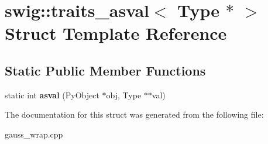 \hypertarget{structswig_1_1traits__asval_3_01_type_01_5_01_4}{\section{swig\-:\-:traits\-\_\-asval$<$ Type $\ast$ $>$ Struct Template Reference}
\label{structswig_1_1traits__asval_3_01_type_01_5_01_4}
}
\subsection*{Static Public Member Functions}
\begin{DoxyCompactItemize}
\item 
\hypertarget{structswig_1_1traits__asval_3_01_type_01_5_01_4_a32b6c9822265d2822408db76cbae92c4}{static int {\bfseries asval} (Py\-Object $\ast$obj, Type $\ast$$\ast$val)}\label{structswig_1_1traits__asval_3_01_type_01_5_01_4_a32b6c9822265d2822408db76cbae92c4}

\end{DoxyCompactItemize}


The documentation for this struct was generated from the following file\-:\begin{DoxyCompactItemize}
\item 
gauss\-\_\-wrap.\-cpp\end{DoxyCompactItemize}
